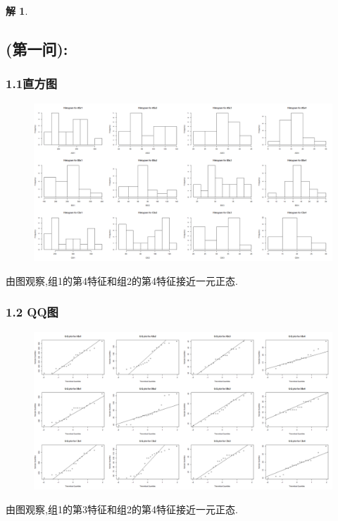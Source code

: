 \documentclass[11pt,a4paper]{ctexart}
\newtheorem*{solution}{解}
\begin{document}
\begin{solution}

\subsection*{(第一问):}
\subsubsection*{1.1直方图}
\end{solution}
\begin{figure}[H]
	\centering
	\includegraphics[width=\textwidth]{8.png}
\end{figure}
由图观察,组1的第4特征和组2的第4特征接近一元正态.

\subsubsection*{1.2 QQ图}

\begin{figure}[H]
	\centering
	\includegraphics[width=\textwidth]{9.png}
\end{figure}
由图观察,组1的第3特征和组2的第4特征接近一元正态.
\end{document}
